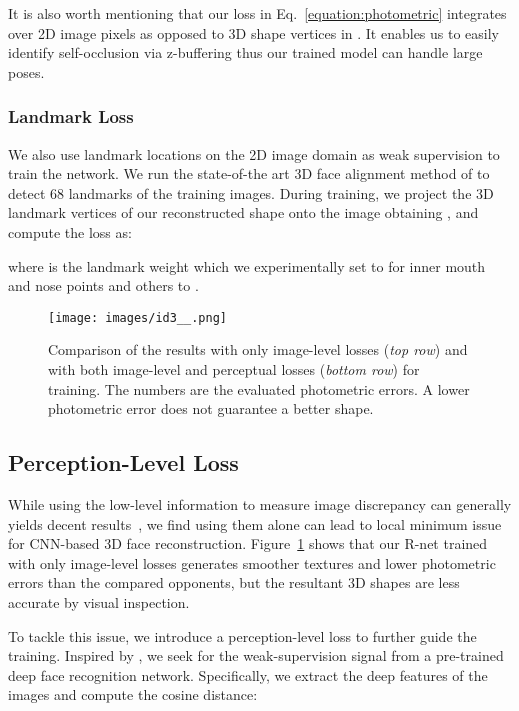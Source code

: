 \documentclass[10pt,twocolumn,letterpaper]{article}
\begin{document}
It is also worth mentioning that our loss in Eq.~\ref{equation:photometric} integrates over 2D image pixels as opposed to 3D shape vertices in \cite{tewari2017mofa,tewari2018self}. It enables us to easily identify self-occlusion via z-buffering thus our trained model can handle large poses.

\subsubsection{Landmark Loss}\label{section:lm}
We also use landmark locations on the 2D image domain as weak supervision to train the network. We run the state-of-the art 3D face alignment method of \cite{bulat2017far} to detect 68 landmarks  of the training images. During training, we project the 3D landmark vertices of our reconstructed shape onto the image obtaining , and compute the loss as:

where  is the landmark weight which we experimentally set to  for inner mouth and nose points and others to .

\begin{figure}[t!]
	\texttt{[image: images/id3\_\_.png]}
	\vspace{-10pt}
	\caption{Comparison of the results with only image-level losses (\emph{top row}) and with both image-level and perceptual losses (\emph{bottom row}) for training. The numbers are the evaluated photometric errors. A lower photometric error does not guarantee a better shape.}\label{fig:id}
\end{figure}

\subsection{Perception-Level Loss}
While using the low-level information to measure image discrepancy can generally yields decent results~\cite{blanz1999morphable,thies2016face2face,tewari2017mofa,tewari2018self}, we find using them alone can lead to local minimum issue for CNN-based 3D face reconstruction. Figure~\ref{fig:id} shows that our R-net trained with only image-level losses generates smoother textures and lower photometric errors than the compared opponents, but the resultant 3D shapes are less accurate by visual inspection.

To tackle this issue, we introduce a perception-level loss to further guide the training. Inspired by \cite{genova2018unsupervised}, we seek for the weak-supervision signal from a pre-trained deep face recognition network. Specifically, we extract the deep features of the images and compute the cosine distance:
\end{document}
